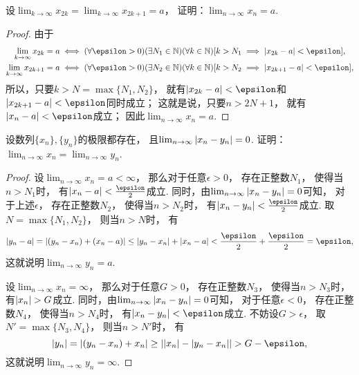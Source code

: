 \begin{example}\label{example:数列极限.奇偶子列收敛则数列收敛}
设\(\lim_{k\to\infty} x_{2k} = \lim_{k\to\infty} x_{2k+1} = a\)，
证明：\(\lim_{n\to\infty} x_n = a\).
\begin{proof}
由于\begin{gather*}
	\lim_{k\to\infty} x_{2k} = a
	\iff
	(\forall\epsilon>0)
	(\exists N_1\in\mathbb{N})
	(\forall k\in\mathbb{N})
	[
		k>N_1
		\implies
		\abs{x_{2k}-a}<\epsilon
	], \\
	\lim_{k\to\infty} x_{2k+1} = a
	\iff
	(\forall\epsilon>0)
	(\exists N_2\in\mathbb{N})
	(\forall k\in\mathbb{N})
	[
		k>N_2
		\implies
		\abs{x_{2k+1}-a}<\epsilon
	],
\end{gather*}
所以，只要\(k>N=\max\{N_1,N_2\}\)，
就有\(\abs{x_{2k}-a}<\epsilon\)和\(\abs{x_{2k+1}-a}<\epsilon\)同时成立；
这就是说，只要\(n>2N+1\)，
就有\(\abs{x_n-a}<\epsilon\)成立；
因此\(\lim_{n\to\infty} x_n = a\).
\end{proof}
\end{example}

\begin{example}\label{example:数列极限的概念.柯西列的等价性}
设数列\(\{x_n\},\{y_n\}\)的极限都存在，
且\(\lim_{n\to\infty} \abs{x_n - y_n} = 0\).
证明：\(\lim_{n\to\infty} x_n = \lim_{n\to\infty} y_n\).
\begin{proof}
设\(\lim_{n\to\infty} x_n = a < \infty\)，
那么对于任意\(\epsilon>0\)，
存在正整数\(N_1\)，
使得当\(n > N_1\)时，
有\(\abs{x_n - a} < \frac\epsilon2\)成立.
同时，由\(\lim_{n\to\infty} \abs{x_n - y_n} = 0\)可知，
对于上述\(\epsilon\)，
存在正整数\(N_2\)，
使得当\(n > N_2\)时，
有\(\abs{x_n - y_n} < \frac\epsilon2\)成立.
取\(N = \max\{N_1,N_2\}\)，
则当\(n > N\)时，
有\begin{equation*}
	\abs{y_n - a}
	= \abs{(y_n - x_n) + (x_n - a)}
	\leq \abs{y_n - x_n} + \abs{x_n - a}
	< \frac\epsilon2 + \frac\epsilon2
	= \epsilon,
\end{equation*}
这就说明\(\lim_{n\to\infty} y_n = a\).

设\(\lim_{n\to\infty} x_n = \infty\)，
那么对于任意\(G>0\)，
存在正整数\(N_3\)，
使得当\(n > N_3\)时，
有\(\abs{x_n} > G\)成立.
同时，由\(\lim_{n\to\infty} \abs{x_n - y_n} = 0\)可知，
对于任意\(\epsilon<0\)，
存在正整数\(N_4\)，
使得当\(n > N_4\)时，
有\(\abs{x_n - y_n} < \epsilon\)成立.
不妨设\(G > \epsilon\)，
取\(N' = \max\{N_3,N_4\}\)，
则当\(n > N'\)时，
有\begin{equation*}
	\abs{y_n}
	= \abs{(y_n - x_n) + x_n}
	\geq \abs{
		\abs{x_n} - \abs{y_n - x_n}
	}
	> G - \epsilon,
\end{equation*}
这就说明\(\lim_{n\to\infty} y_n = \infty\).
\end{proof}
\end{example}
